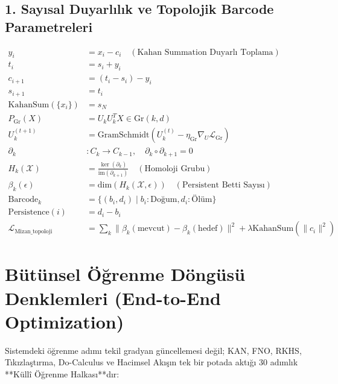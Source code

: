 \documentclass[11pt, a4paper]{article}
\begin{document}
\subsection{1. Sayısal Duyarlılık ve Topolojik Barcode Parametreleri}
\begin{align}
y_i &= x_i - c_i \quad (\text{Kahan Summation Duyarlı Toplama}) \\
t_i &= s_i + y_i \\
c_{i+1} &= (t_i - s_i) - y_i \\
s_{i+1} &= t_i \\
\text{KahanSum}(\{x_i\}) &= s_N \\
P_{\text{Gr}}(X) &= U_k U_k^T X \in \text{Gr}(k, d) \\
U_k^{(t+1)} &= \text{GramSchmidt}\left( U_k^{(t)} - \eta_{\text{Gr}} \nabla_{U} \mathcal{L}_{\text{Gr}} \right) \\
\partial_k &: C_k \to C_{k-1}, \quad \partial_k \circ \partial_{k+1} = 0 \\
H_k(\mathcal{X}) &= \frac{\ker(\partial_k)}{\text{im}(\partial_{k+1})} \quad (\text{Homoloji Grubu}) \\
\beta_k(\epsilon) &= \text{dim}(H_k(\mathcal{X}, \epsilon)) \quad (\text{Persistent Betti Sayısı}) \\
\text{Barcode}_k &= \{ (b_i, d_i) \mid b_i: \text{Doğum}, d_i: \text{Ölüm} \} \\
\text{Persistence}(i) &= d_i - b_i \\
\mathcal{L}_{\text{Mizan\_topoloji}} &= \sum_k \|\beta_k(\text{mevcut}) - \beta_k(\text{hedef})\|^2 + \lambda \text{KahanSum}(\|c_i\|^2)
\end{align}

\section{Bütünsel Öğrenme Döngüsü Denklemleri (End-to-End Optimization)}

Sistemdeki öğrenme adımı tekil gradyan güncellemesi değil; KAN, FNO, RKHS, Tıkızlaştırma, Do-Calculus ve Hacimsel Akışın tek bir potada aktığı 30 adımlık **Küllî Öğrenme Halkası**dır:
\end{document}
